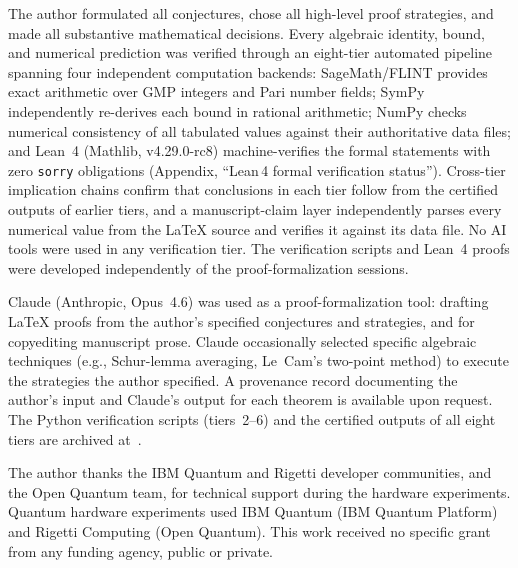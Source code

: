 \documentclass[twocolumn,prx,aps,superscriptaddress,longbibliography,floatfix]{revtex4-2}
\begin{document}
The author formulated all conjectures, chose all high-level proof
strategies, and made all substantive mathematical decisions.
Every algebraic identity, bound, and numerical prediction was
verified through an eight-tier automated pipeline spanning four
independent computation backends:
SageMath/FLINT provides exact arithmetic over GMP integers and
Pari number fields;
SymPy independently re-derives each bound in rational arithmetic;
NumPy checks numerical consistency of all tabulated values against
their authoritative data files;
and Lean~4 (Mathlib, v4.29.0-rc8) machine-verifies the formal
statements with zero \texttt{sorry} obligations
(Appendix, ``Lean\,4 formal verification status'').
Cross-tier implication chains confirm that conclusions in each tier
follow from the certified outputs of earlier tiers, and a
manuscript-claim layer independently parses every numerical value
from the \LaTeX{} source and verifies it against its data file.
No AI tools were used in any verification tier.
The verification scripts and Lean~4 proofs were developed
independently of the proof-formalization sessions.

Claude (Anthropic, Opus~4.6) was used as a proof-formalization
tool: drafting LaTeX proofs from the author's specified
conjectures and strategies, and for copyediting manuscript prose.
Claude occasionally selected specific algebraic techniques
(e.g., Schur-lemma averaging, Le~Cam's two-point method) to
execute the strategies the author specified.
A provenance record documenting the author's input and Claude's
output for each theorem is available upon request.
The Python verification scripts (tiers~2--6) and the
certified outputs of all eight tiers are archived
at~\cite{zenodo}.

\begin{acknowledgments}
The author thanks the IBM Quantum and Rigetti developer
communities, and the Open Quantum team, for technical support
during the hardware experiments.
Quantum hardware experiments used IBM Quantum
(IBM Quantum Platform) and Rigetti Computing (Open Quantum).
This work received no specific grant from any funding agency,
public or private.
\end{acknowledgments}
\end{document}
